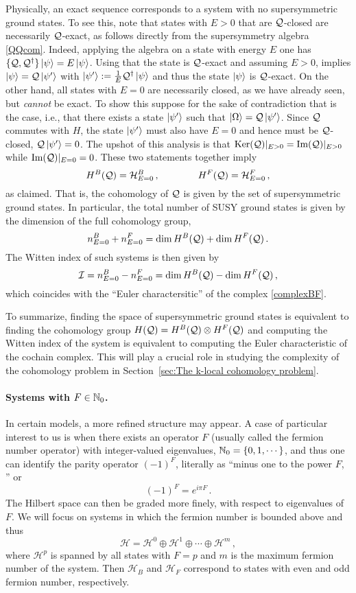 \documentclass[11pt]{article}
\numberwithin{equation}{section}
\def\cI{{\cal I}}
\def\cQ{{\cal Q}}
\newcommand\equ[1] {\begin{equation}#1\end{equation}}
\renewcommand\( {\left(}
\renewcommand\) {\right)}
\def\cH{\mathcal H}
\begin{document}
Physically, an exact sequence corresponds to a system with no supersymmetric ground states. To see this, note that states with $E>0$ that are $\cQ$-closed  are necessarily $\cQ$-exact, as follows directly from the supersymmetry algebra \eqref{QQcom}. Indeed, applying the algebra  on a state with energy $E$ one has $\{\cQ,\cQ^\dagger\}\ket{\psi}=E\ket{\psi}$. Using that the state is $\cQ$-exact and assuming $E>0$, implies $\ket{\psi}= \cQ \ket{\psi'}$ with $\ket{\psi'}:= \frac{1}{E} \cQ^\dagger \ket{\psi}$ and thus the state $\ket{\psi}$ is  $\cQ$-exact.  On the other hand, all  states with $E=0$ are necessarily closed, as we have already seen, but   {\it cannot} be exact. To show this  suppose for the sake of contradiction that is the case, i.e., that there exists a state $\ket{\psi'}$ such that $\ket{\Omega}=\cQ\ket{\psi'}$. Since $\cQ$ commutes with $H$, the state $\ket{\psi'}$ must also have $E=0$ and hence must be $\cQ$-closed,  $\cQ\ket{\psi'}=0$. The upshot of this analysis is that $\text{Ker}(\cQ)|_{E>0}=\text{Im}(\cQ)|_{E>0}$ while  $\text{Im}(\cQ)|_{E=0}=0$. These two statements together imply
\equ{
 H^B(\cQ)= \cH^B_{E=0}\,,\qquad \qquad  H^F(\cQ)= \cH^F_{E=0}\,,
}
as claimed.  That is, the cohomology of  $\cQ$ is given by the set of supersymmetric ground states. In particular, the total number of SUSY ground states is given by the dimension of the full cohomology group,
\equ{\label{totnsattes}
n_{E=0}^{B}+n_{E=0}^{F}=\dim H^{B}(\cQ) +\dim H^F(\cQ)\,.
}
The Witten index of such systems is then given by 
\equ{\label{Wcoh}
\cI= n_{E=0}^{B}-n_{E=0}^{F}= \dim H^B(\cQ)- \dim H^F(\cQ)\,,
}
which coincides with the ``Euler charactersitic'' of the complex \eqref{complexBF}. 



To summarize, finding the space of supersymmetric ground states is equivalent to finding the cohomology group $H(\cQ)=H^{B}(\cQ)\otimes H^{F}(\cQ)$ and computing the Witten index of the system is equivalent to computing the Euler characteristic of the cochain complex. This  will play a crucial role in studying the complexity of the cohomology problem in Section~\ref{sec:The k-local cohomology problem}.



\paragraph{Systems with $F\in \Bbb N_{0}$.} In certain models, a more refined structure may appear. A case of particular interest to us is when there exists an operator $F$   (usually called the fermion number operator)  with integer-valued eigenvalues, $\Bbb N_{0}=\{0,1,\cdots\}$, and thus one can identify the parity operator $(-1)^{F}$, literally as ``minus one to the power $F$, '' or
\equ{
(-1)^{F}=e^{i\pi F}\,.
}
The Hilbert space can then be graded more finely, with respect to eigenvalues  of $F$. We will focus on systems in which the fermion number is bounded above and thus
\equ{
\cH=\cH^{0}\oplus \cH^{1}\oplus\cdots \oplus \cH^{m}\,,
}
where $\cH^{p}$ is spanned by all states with $F=p$ and $m$ is the maximum fermion number of the system. Then $\cH_{B}$ and $ \cH_{F}$ correspond to states with even and odd fermion number, respectively.
\end{document}
